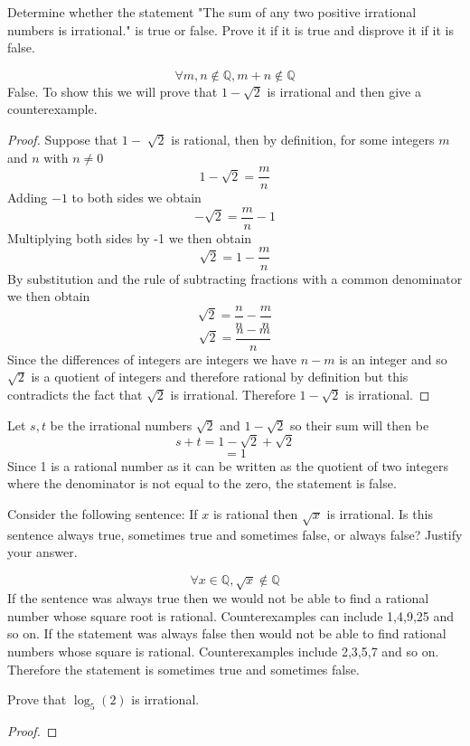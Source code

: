 \documentclass[12pt,letterpaper, onecolumn]{exam}
\begin{document}
	\begin{questions}
		\setcounter{question}{10}\question Determine whether the statement "The sum of any two positive irrational numbers is irrational." is true or false. Prove it if it is true and disprove it if it is false.
		\begin{solution}
			$$\forall m,n \notin \mathbb{Q}, m+n \notin \mathbb{Q}$$
			False. To show this we will prove that $1-\sqrt{2}$ is irrational and then give a counterexample.
			\begin{proof}
			Suppose that $1-\sqrt[]{2}$ is rational, then by definition, for some integers $m$ and $n$ with $n\neq0$
			$$1-\sqrt{2}=\frac{m}{n}$$
			Adding $-1$ to both sides we obtain
			$$-\sqrt{2}=\frac{m}{n}-1$$
			Multiplying both sides by -1 we then obtain
			$$\sqrt{2}=1-\frac{m}{n}$$
			By substitution and the rule of subtracting fractions with a common denominator we then obtain
			$$\sqrt{2}=\frac{n}{n}-\frac{m}{n}$$
			$$\sqrt{2}=\frac{n-m}{n}$$
			Since the differences of integers are integers we have $n-m$ is an integer and so $\sqrt{2}$ is a quotient of integers and therefore rational by definition but this contradicts the fact that $\sqrt{2}$ is irrational. Therefore $1-\sqrt{2}$ is irrational.
			\end{proof}
			Let $s, t$ be the irrational numbers $\sqrt{2}$ and $1-\sqrt{2}$ so their sum will then be
			$$s+t=1-\sqrt{2}+\sqrt{2}$$
			$$=1$$
			Since 1 is a rational number as it can be written as the quotient of two integers where the denominator is not equal to the zero, the statement is false.
		\end{solution}
		\setcounter{question}{13}\question Consider the following sentence: If $x$ is rational then $\sqrt{x}$ is irrational. Is this sentence always true, sometimes true and sometimes false, or always false? Justify your answer.
		\begin{solution}
		$$\forall x \in \mathbb{Q}, \sqrt{x} \notin \mathbb{Q}$$
		If the sentence was always true then we would not be able to find a rational number whose square root is rational. Counterexamples can include 1,4,9,25 and so on. If the statement was always false then would not be able to find rational numbers whose square is rational. Counterexamples include 2,3,5,7 and so on. Therefore the statement is sometimes true and sometimes false.
		\end{solution}
		\setcounter{question}{23}\question Prove that $\log_5 (2)$ is irrational.
		\begin{solution}
		\begin{proof}

\end{proof}
\end{solution}
\end{questions}
\end{document}

